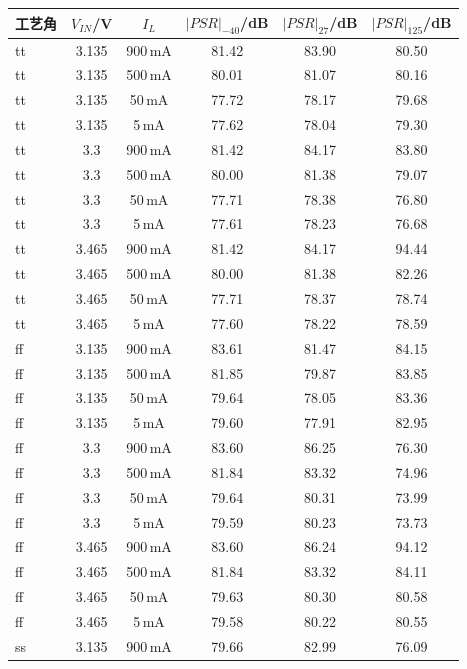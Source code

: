 \documentclass[a4paper, 12pt]{article}
\begin{document}
\begin{table}[H]
  \centering
  \scriptsize
  \setlength{\tabcolsep}{4pt}
  \begin{tabular}{lccccc}
    \toprule
    工艺角 & $V_{IN}$/V & $I_L$ & $|PSR|_{-40}$/dB & $|PSR|_{27}$/dB & $|PSR|_{125}$/dB \\
    \midrule
    tt & 3.135 & 900\,mA & 81.42 & 83.90 & 80.50 \\
    tt & 3.135 & 500\,mA & 80.01 & 81.07 & 80.16 \\
    tt & 3.135 & 50\,mA & 77.72 & 78.17 & 79.68 \\
    tt & 3.135 & 5\,mA & 77.62 & 78.04 & 79.30 \\
    tt & 3.3 & 900\,mA & 81.42 & 84.17 & 83.80 \\
    tt & 3.3 & 500\,mA & 80.00 & 81.38 & 79.07 \\
    tt & 3.3 & 50\,mA & 77.71 & 78.38 & 76.80 \\
    tt & 3.3 & 5\,mA & 77.61 & 78.23 & 76.68 \\
    tt & 3.465 & 900\,mA & 81.42 & 84.17 & 94.44 \\
    tt & 3.465 & 500\,mA & 80.00 & 81.38 & 82.26 \\
    tt & 3.465 & 50\,mA & 77.71 & 78.37 & 78.74 \\
    tt & 3.465 & 5\,mA & 77.60 & 78.22 & 78.59 \\
    \midrule
    ff & 3.135 & 900\,mA & 83.61 & 81.47 & 84.15 \\
    ff & 3.135 & 500\,mA & 81.85 & 79.87 & 83.85 \\
    ff & 3.135 & 50\,mA & 79.64 & 78.05 & 83.36 \\
    ff & 3.135 & 5\,mA & 79.60 & 77.91 & 82.95 \\
    ff & 3.3 & 900\,mA & 83.60 & 86.25 & 76.30 \\
    ff & 3.3 & 500\,mA & 81.84 & 83.32 & 74.96 \\
    ff & 3.3 & 50\,mA & 79.64 & 80.31 & 73.99 \\
    ff & 3.3 & 5\,mA & 79.59 & 80.23 & 73.73 \\
    ff & 3.465 & 900\,mA & 83.60 & 86.24 & 94.12 \\
    ff & 3.465 & 500\,mA & 81.84 & 83.32 & 84.11 \\
    ff & 3.465 & 50\,mA & 79.63 & 80.30 & 80.58 \\
    ff & 3.465 & 5\,mA & 79.58 & 80.22 & 80.55 \\
    \midrule
    ss & 3.135 & 900\,mA & 79.66 & 82.99 & 76.09 \\

\end{tabular}
\end{table}
\end{document}
